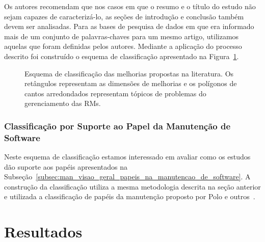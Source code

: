 Os autores recomendam que nos casos em que o resumo e o título do estudo não
sejam capazes de caracterizá-lo, as seções de introdução e conclusão também
devem ser analisadas. Para as bases de pesquisa de dados em que era informado
mais de um conjunto de palavras-chaves para um mesmo artigo, utilizamos aquelas
que foram definidas pelos autores. Mediante a aplicação do processo descrito foi
construído o esquema de classificação apresentado na
Figura~\ref{fig:diagrama-esquema-dimensao-melhorias}.

\begin{figure}[tb] \centering
    \caption{Esquema de classificação das melhorias propostas na literatura. Os
        retângulos representam as dimensões de melhorias e os polígonos de
        cantos arredondados representam tópicos de problemas do gerenciamento
        das RMs.}
\label{fig:diagrama-esquema-dimensao-melhorias}
\end{figure}

\subsubsection{Classificação por Suporte ao Papel da Manutenção de Software}
\label{subsubsec:map-esquema-suporte-papel-man}

Neste esquema de classificação estamos interessado em avaliar como os estudos
dão suporte aos papéis apresentados na
Subseção~\ref{subsec:man_visao_geral_papeis_na_manutencao_de_software}. A
construção da classificação utiliza a mesma metodologia descrita na seção
anterior e utilizada a classificação de papéis da manutenção proposto por Polo e
outros~\cite{Polo1999}.

\section{Resultados}
\label{sec:mapeamento_resultados}

